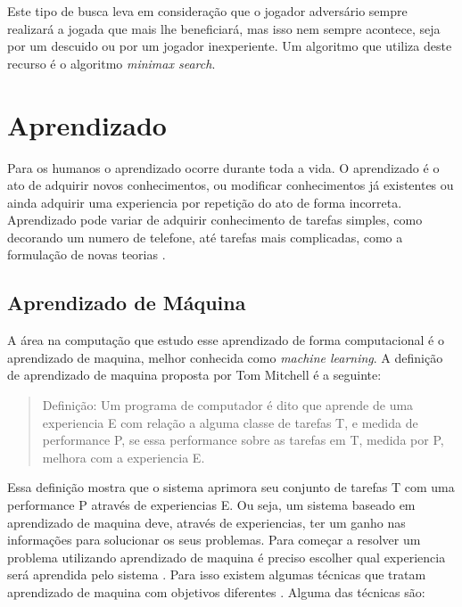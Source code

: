 
Este tipo de busca leva em consideração que o jogador adversário sempre realizará a jogada que mais lhe beneficiará, mas isso nem sempre acontece, seja por um descuido ou por um jogador inexperiente. Um algoritmo que utiliza deste recurso é o algoritmo \textit{minimax search}.


\section{Aprendizado} 
Para os humanos o aprendizado ocorre durante toda a vida. 
O aprendizado é o ato de adquirir novos conhecimentos, ou modificar conhecimentos já existentes ou ainda adquirir uma experiencia por repetição do ato de forma incorreta. 
Aprendizado pode variar de adquirir conhecimento de tarefas simples, como decorando um numero de telefone, até tarefas mais complicadas, como a formulação de novas teorias \cite{intelligence2003modern}. 

\subsection{Aprendizado de Máquina} 

A área na computação que estudo esse aprendizado de forma computacional é o aprendizado de maquina, melhor conhecida como \textit{machine learning}. A definição de aprendizado de maquina proposta por Tom Mitchell \cite{Mitchell1997ML} é a seguinte:

 \begin{quote}
 	Definição: Um programa de computador é dito que aprende de uma experiencia E com relação a alguma classe de tarefas T, e medida de performance P, se essa performance sobre as tarefas em T, medida por P, melhora com a experiencia E.
 \end{quote}

Essa definição mostra que o sistema aprimora seu conjunto de tarefas T com uma performance P através de experiencias E. Ou seja, um sistema baseado em aprendizado de maquina deve, através de experiencias, ter um ganho nas informações para solucionar os seus problemas. Para começar a resolver um problema utilizando aprendizado de maquina é preciso escolher qual experiencia será aprendida pelo sistema \cite{Mitchell1997ML}. Para isso existem algumas técnicas que tratam aprendizado de maquina com objetivos diferentes \cite{intelligence2003modern}. Alguma das técnicas são: %


